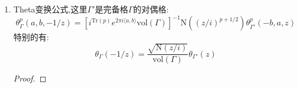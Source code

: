 \begin{enumerate}
\begin{proof}
    	对正实数$\delta$,对任意$z\in\textbf{H}$,我们有:
    	$$|\mathrm{N}\left((a+g)^p\right)e^{\pi\langle(a+g)z,a+g\rangle+2\pi i\langle b,g\rangle}|\le|\mathrm{N}\left((a+g)^p\right)|e^{-\pi\delta\langle a+g,a+g\rangle}$$
    	把右侧记作$f_g(a)$,其中$g\in\Gamma$和$a\in\textbf{R}$.对任意紧子集$\textbf{K}\subseteq\textbf{R}$,记$|f_g|_{\textbf{K}}=\sup_{x\in\textbf{K}}|f_g(x)|$.问题归结为证明:
    	$$\sum_{g\in\Gamma}|f_g|_{\textbf{K}}<\infty$$
    	取$g_1,\cdots,g_n$是$\Gamma$的一组$\mathbb{Z}$基.任取$g=\sum_{1\le i\le n}m_ig_i\in\Gamma$,记$\mu_g=\max_i|m_i|$.再记$\Vert x\Vert=\sqrt{\langle x,x\rangle}$.如果$\Vert g\Vert\ge 4\sup_{x\in\textbf{K}}\Vert x\Vert$,再记$\varepsilon=\inf_{\sum y_i^2=1}\langle g_i,g_j\rangle y_iy_j$是矩阵$\left(\langle g_i,g_j\rangle\right)$的最小特征值.那么对任意$a\in\textbf{K}$就有:
    	\begin{align*}
    		\langle a+g,a+g\rangle&\ge\left(\Vert a\Vert-\Vert g\Vert\right)^2\\&\ge\Vert g\Vert^2-2\Vert a\Vert\cdot\Vert g\Vert\\&\ge\frac{1}{2}\Vert g\Vert^2\\&\ge\frac{1}{2}\varepsilon\sum_{i=1}^nm_i^2\\&\ge\frac{1}{2}\varepsilon\mu_g^2
    	\end{align*}
    	$\mathrm{N}\left((a+\sum_im_ig_i)^p\right)$关于$m_i$是次数为$q=\mathrm{Tr}(p)$的多项式,它的系数是$a$的连续函数,如果取$\mu_g$足够大,就可以保证对任意$a\in\textbf{K}$有$|\mathrm{N}\left((a+g)^p\right)|\le\mu_g^{q+1}$.那些$\Vert g\Vert<4\sup_{x\in\textbf{K}}\Vert x\Vert$的$g$只有有限个,除去这有限个点的子集记作$\Gamma'\subseteq\Gamma$.那么有:
    	$$\sum_{g\in\Gamma'}|f_g|_{\textbf{K}}\le\sum_{\mu\ge0}P(\mu)\mu^{q+1}e^{-\pi\delta\varepsilon\mu^2/2}$$
    	
    	这里$P(\mu)=\#\{\textbf{m}\in\mathbb{Z}^n\mid\max_i|m_i|=\mu\}=(2\mu+1)^n-(2\mu-1)^n$.于是得到收敛性.
    \end{proof}
    \item Theta变换公式,这里$\Gamma'$是完备格$\Gamma$的对偶格:
    $$\theta_{\Gamma}^p(a,b,-1/z)=\left[i^{\mathrm{Tr}(p)}e^{2\pi i\langle a,b\rangle}\mathrm{vol}(\Gamma)\right]^{-1}\mathrm{N}\left((z/i)^{p+1/2}\right)\theta^p_{\Gamma'}(-b,a,z)$$
    特别的有:
    $$\theta_{\Gamma}(-1/z)=\frac{\sqrt{\mathrm{N}(z/i)}}{\mathrm{vol}(\Gamma)}\theta_{\Gamma'}(z)$$
    \begin{proof}
    	

\end{proof}
\end{enumerate}

